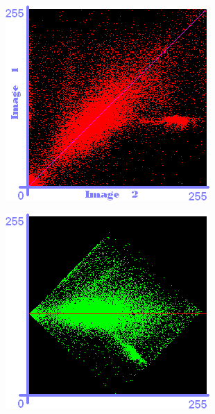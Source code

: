 \begin{figure}[h!]
\centering
\begin{minipage}{0.3\textwidth}
    \centering
    \includegraphics[width=\textwidth]{pca1}\label{fig:cp01_pca1}
\end{minipage}
\begin{minipage}{0.3\textwidth}
    \centering
    \includegraphics[width=\textwidth]{pca2}\label{fig:cp01_pca2}

\end{minipage}
\end{figure}
